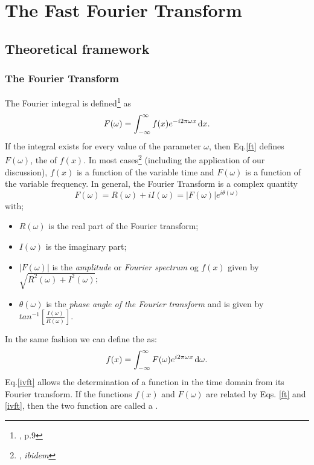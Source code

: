 \documentclass[class=article,crop=false]{standalone}
\begin{document}
\section{The Fast Fourier Transform}
\subsection{Theoretical framework}
\subsubsection{The Fourier Transform}
The Fourier integral is defined\footnote{\cite{FFTbook}, p.9} as
\begin{equation}\label{ft}
F(\omega)=\int_{-\infty}^{\infty}f(x)e^{-i2\pi\omega x}\mathop{}\!\mathrm{d} x.
\end{equation}
If the integral exists for every value of the parameter $\omega$, then Eq.\ref{ft} defines $F(\omega)$, the  of $f(x)$. In most cases\footnote{\cite{FFTbook}, \textit{ibidem}} (including the application of our discussion), $f(x)$ is a function of the variable time and $F(\omega)$ is a function of the variable frequency. In general, the Fourier Transform is a complex quantity
\begin{equation}
	F(\omega)=R(\omega)+iI(\omega)=|F(\omega)|e^{i\theta(\omega)}
\end{equation}
with;
\begin{itemize}
	\item $R(\omega)$ is the real part of the Fourier transform;
	\item $I(\omega)$ is the imaginary part;
	\item $|F(\omega)|$ is the \textit{amplitude} or \textit{Fourier spectrum} og $f(x)$ given by $\sqrt{R^2(\omega)+I^2(\omega)}$;
	\item $\theta(\omega)$ is the \textit{phase angle of the Fourier transform} and is given by $tan^{-1}\left[\frac{I(\omega)}{R(\omega)}\right]$.
\end{itemize}
In the same fashion we can define the  as:
\begin{equation}\label{ivft}
	f(x)=\int_{-\infty}^{\infty}F(\omega)e^{i2\pi\omega x}\mathop{}\!\mathrm{d} \omega.
\end{equation}
Eq.\ref{ivft} allows the determination of a function in the time domain from its Fourier transform. If the functions $f(x)$ and $F(\omega)$ are related by Eqs. \ref{ft} and \ref{ivft}, then the two function are called a .\\
\end{document}
